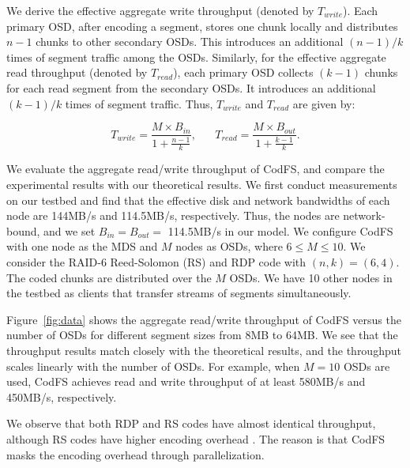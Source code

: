 We derive the effective aggregate write throughput (denoted by
$T_{write}$).  Each primary OSD, after encoding a segment, stores one chunk
locally and distributes $n-1$ chunks to other secondary OSDs.  This introduces
an additional $(n-1)/k$ times of segment traffic among the OSDs.
Similarly, for the effective aggregate read throughput (denoted by
$T_{read}$), each primary OSD collects $(k-1)$ chunks for each read segment
from the secondary OSDs. It introduces an additional $(k-1)/k$ times of segment
traffic.  Thus, $T_{write}$ and $T_{read}$ are given by: 

\vspace{-5pt}
\begin{equation*}
    T_{write} = \frac{M\times B_{in}}{1+\frac{n-1}{k}} , \hspace{20pt}
    T_{read} = \frac {M\times B_{out}}{1+\frac{k-1}{k}}.
\end{equation*}


We evaluate the aggregate read/write throughput of CodFS, and compare the
experimental results with our theoretical results.  We first conduct
measurements on our testbed and find that the effective disk and network
bandwidths of each node are 144MB/s and 114.5MB/s, respectively.  Thus,
the nodes are network-bound, and we set $B_{in}\!=\!B_{out}\!=$ 114.5MB/s in
our model.  We configure CodFS with one node as the MDS and $M$ nodes as OSDs,
where $6\!\le\!M\!\le\!10$.  We consider the RAID-6 Reed-Solomon (RS)
\cite{reed60} and RDP
code \cite{corbett04} with $(n,k) = (6,4)$.  The coded chunks are distributed
over the $M$ OSDs.  We
have 10 other nodes in the testbed as clients that transfer streams of
segments simultaneously. 

Figure~\ref{fig:data} shows the aggregate read/write throughput of CodFS
versus the number of OSDs for different segment sizes from 8MB to 64MB. We see
that the throughput results match closely with the theoretical results, and the
throughput scales linearly with the number of OSDs.  For example, when $M=10$
OSDs are used, CodFS achieves read and write throughput of at least 580MB/s
and 450MB/s, respectively.  

We observe that both RDP and RS codes have almost identical throughput, although
RS codes have higher encoding overhead \cite{plank09}.  The reason is that CodFS
masks the encoding overhead through parallelization. 

